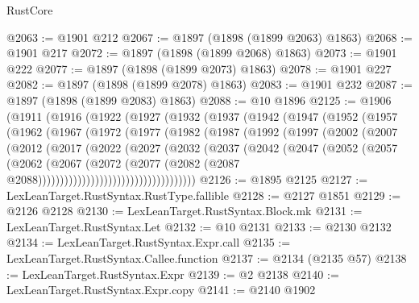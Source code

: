 \begin{lexlean}{RustCore}
\begin{coremodule}
@2063 := @1901 @212
@2067 := @1897 (@1898 (@1899 @2063) @1863)
@2068 := @1901 @217
@2072 := @1897 (@1898 (@1899 @2068) @1863)
@2073 := @1901 @222
@2077 := @1897 (@1898 (@1899 @2073) @1863)
@2078 := @1901 @227
@2082 := @1897 (@1898 (@1899 @2078) @1863)
@2083 := @1901 @232
@2087 := @1897 (@1898 (@1899 @2083) @1863)
@2088 := @10 @1896
@2125 := @1906
    (@1911
      (@1916
        (@1922
          (@1927
            (@1932
              (@1937
                (@1942
                  (@1947
                    (@1952
                      (@1957
                        (@1962
                          (@1967
                            (@1972
                              (@1977
                                (@1982
                                  (@1987
                                    (@1992
                                      (@1997
                                        (@2002
                                          (@2007
                                            (@2012
                                              (@2017
                                                (@2022
                                                  (@2027
                                                    (@2032
                                                      (@2037
                                                        (@2042
                                                          (@2047
                                                            (@2052
                                                              (@2057
                                                                (@2062
                                                                  (@2067
                                                                    (@2072
                                                                      (@2077
                                                                        (@2082
                                                                          (@2087
                                                                            @2088))))))))))))))))))))))))))))))))))))
@2126 := @1895 @2125
@2127 := LexLeanTarget.RustSyntax.RustType.fallible
@2128 := @2127 @1851
@2129 := @2126 @2128
@2130 := LexLeanTarget.RustSyntax.Block.mk
@2131 := LexLeanTarget.RustSyntax.Let
@2132 := @10 @2131
@2133 := @2130 @2132
@2134 := LexLeanTarget.RustSyntax.Expr.call
@2135 := LexLeanTarget.RustSyntax.Callee.function
@2137 := @2134 (@2135 @57)
@2138 := LexLeanTarget.RustSyntax.Expr
@2139 := @2 @2138
@2140 := LexLeanTarget.RustSyntax.Expr.copy
@2141 := @2140 @1902

\end{coremodule}
\end{lexlean}
